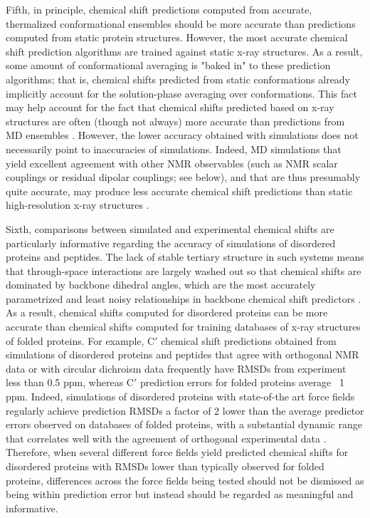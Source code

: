 \documentclass[9pt,review]{livecoms}
\begin{document}
Fifth, in principle, chemical shift predictions computed from accurate, thermalized conformational ensembles should be more accurate than predictions computed from static protein structures.
However, the most accurate chemical shift prediction algorithms are trained against static x-ray structures.
As a result, some amount of conformational averaging is "baked in" to these prediction algorithms; that is, chemical shifts predicted from static conformations already implicitly account for the solution-phase averaging over conformations.
This fact may help account for the fact that chemical shifts predicted based on x-ray structures are often (though not always) more accurate than predictions from MD ensembles \cite{li_certification_2010,markwick_enhanced_2010,robustelli_interpreting_2012,robustelli_conformational_2013}.
However, the lower accuracy obtained with simulations does not necessarily point to inaccuracies of simulations.
Indeed, MD simulations that yield excellent agreement with other NMR observables (such as NMR scalar couplings or residual dipolar couplings; see below), and that are thus presumably quite accurate, may produce less accurate chemical shift predictions than static high-resolution x-ray structures \cite{li_certification_2010,robustelli_interpreting_2012,robustelli_developing_2018}.

Sixth, comparisons between simulated and experimental chemical shifts are particularly informative regarding the accuracy of simulations of disordered proteins and peptides.
The lack of stable tertiary structure in such systems means that through-space interactions are largely washed out so that chemical shifts are dominated by backbone dihedral angles, which are the most accurately parametrized and least noisy relationships in backbone chemical shift predictors \cite{salmon_nmr_2010}.
As a result, chemical shifts computed for disordered proteins can be more accurate than chemical shifts computed for training databases of x-ray structures of folded proteins.
For example, C$'$ chemical shift predictions obtained from simulations of disordered proteins and peptides that agree with orthogonal NMR data or with circular dichroism data frequently have RMSDs from experiment less than 0.5 ppm, whereas C$'$ prediction errors for folded proteins average ~1 ppm.
Indeed, simulations of disordered proteins with state-of-the art force fields regularly achieve prediction RMSDs a factor of 2 lower than the average predictor errors observed on databases of folded proteins, with a substantial dynamic range that correlates well with the agreement of orthogonal experimental data \cite{salmon_nmr_2010,robustelli_conformational_2013,schwalbe_predictive_2014,robustelli_developing_2018}.
Therefore, when several different force fields yield predicted chemical shifts for disordered proteins with RMSDs lower than typically observed for folded proteins, differences across the force fields being tested should not be dismissed as being within prediction error but instead should be regarded as meaningful and informative.
\end{document}
